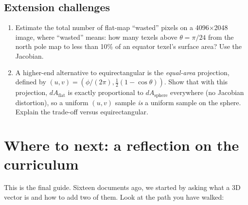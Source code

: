 \documentclass{article}
\begin{document}
\subsection*{Extension challenges}

\begin{enumerate}
  \item[E1.] Estimate the total number of flat-map ``wasted'' pixels on a
        4096$\times$2048 image, where ``wasted'' means: how many texels above
        $\theta = \pi/24$ from the north pole map to less than 10\% of an
        equator texel's surface area? Use the Jacobian.
  \item[E2.] A higher-end alternative to equirectangular is the
        \emph{equal-area} projection, defined by
        $(u, v) = (\phi / (2\pi), \tfrac{1}{2}(1 - \cos\theta))$. Show that
        with this projection, $dA_{\text{flat}}$ is exactly proportional to
        $dA_{\text{sphere}}$ everywhere (no Jacobian distortion), so a
        uniform $(u, v)$ sample \emph{is} a uniform sample on the sphere.
        Explain the trade-off versus equirectangular.
\end{enumerate}

\section{Where to next: a reflection on the curriculum}

This is the final guide. Sixteen documents ago, we started by asking what a
3D vector is and how to add two of them. Look at the path you have walked:
\end{document}
